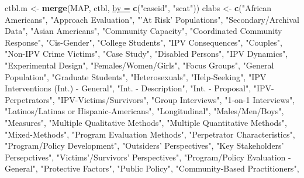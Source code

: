 \documentclass[]{tufte-handout}
\newenvironment{Shaded}{}{}
\newcommand{\KeywordTok}[1]{\textbf{{#1}}}
\newcommand{\DataTypeTok}[1]{\underline{{#1}}}
\newcommand{\StringTok}[1]{{#1}}
\newcommand{\NormalTok}[1]{{#1}}
\begin{document}
\begin{Shaded}
\begin{Highlighting}[]
\NormalTok{ctbl.m <-}\StringTok{ }\KeywordTok{merge}\NormalTok{(MAP, ctbl, }\DataTypeTok{by =} \KeywordTok{c}\NormalTok{(}\StringTok{"caseid"}\NormalTok{, }\StringTok{"scat"}\NormalTok{))}
\NormalTok{clabs <-}\StringTok{ }\KeywordTok{c}\NormalTok{(}\StringTok{"African Americans"}\NormalTok{, }\StringTok{"Approach Evaluation"}\NormalTok{, }\StringTok{"'At Risk' Populations"}\NormalTok{, }
    \StringTok{"Secondary/Archival Data"}\NormalTok{, }\StringTok{"Asian Americans"}\NormalTok{, }\StringTok{"Community Capacity"}\NormalTok{, }
    \StringTok{"Coordinated Community Response"}\NormalTok{, }\StringTok{"Cis-Gender"}\NormalTok{, }\StringTok{"College Students"}\NormalTok{, }
    \StringTok{"IPV Consequences"}\NormalTok{, }\StringTok{"Couples"}\NormalTok{, }\StringTok{"Non-IPV Crime Victims"}\NormalTok{, }\StringTok{"Case Study"}\NormalTok{, }
    \StringTok{"Disabled Persons"}\NormalTok{, }\StringTok{"IPV Dynamics"}\NormalTok{, }\StringTok{"Experimental Design"}\NormalTok{, }
    \StringTok{"Females/Women/Girls"}\NormalTok{, }\StringTok{"Focus Groups"}\NormalTok{, }\StringTok{"General Population"}\NormalTok{, }
    \StringTok{"Graduate Students"}\NormalTok{, }\StringTok{"Heterosexuals"}\NormalTok{, }\StringTok{"Help-Seeking"}\NormalTok{, }\StringTok{"IPV Interventions (Int.) - General"}\NormalTok{, }
    \StringTok{"Int. - Description"}\NormalTok{, }\StringTok{"Int. - Proposal"}\NormalTok{, }\StringTok{"IPV-Perpetrators"}\NormalTok{, }
    \StringTok{"IPV-Victims/Survivors"}\NormalTok{, }\StringTok{"Group Interviews"}\NormalTok{, }\StringTok{"1-on-1 Interviews"}\NormalTok{, }
    \StringTok{"Latinos/Latinas or Hispanic-Americans"}\NormalTok{, }\StringTok{"Longitudinal"}\NormalTok{, }
    \StringTok{"Males/Men/Boys"}\NormalTok{, }\StringTok{"Measures"}\NormalTok{, }\StringTok{"Multiple Qualitative Methods"}\NormalTok{, }
    \StringTok{"Multiple Quantitative Methods"}\NormalTok{, }\StringTok{"Mixed-Methods"}\NormalTok{, }\StringTok{"Program Evaluation Methods"}\NormalTok{, }
    \StringTok{"Perpetrator Characteristics"}\NormalTok{, }\StringTok{"Program/Policy Development"}\NormalTok{, }
    \StringTok{"Outsiders' Perspectives"}\NormalTok{, }\StringTok{"Key Stakeholders' Persepctives"}\NormalTok{, }
    \StringTok{"Victims'/Survivors' Perspectives"}\NormalTok{, }\StringTok{"Program/Policy Evaluation - General"}\NormalTok{, }
    \StringTok{"Protective Factors"}\NormalTok{, }\StringTok{"Public Policy"}\NormalTok{, }\StringTok{"Community-Based Practitioners"}\NormalTok{, }

\end{Highlighting}
\end{Shaded}
\end{document}
